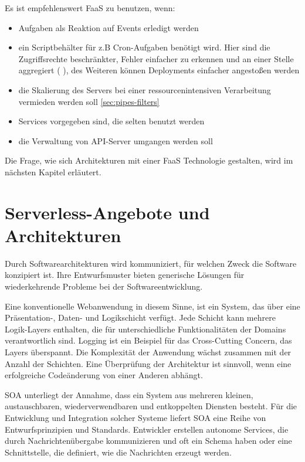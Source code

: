 \documentclass[
12pt,
english,
ngerman,
headsepline,
twoside,
openright,
numbers=noenddot,version=first
]{scrreprt}
\begin{document}
Es ist empfehlenswert \acrshort{FaaS} zu benutzen, wenn:
\begin{itemize}
	\item Aufgaben als Reaktion auf Events erledigt werden
	\item ein Scriptbehälter für z.B Cron-Aufgaben benötigt wird. Hier sind die Zugriffsrechte beschränkter, Fehler einfacher zu erkennen und an einer Stelle aggregiert ( \cite{awsCloudWatch} ), des Weiteren können Deployments einfacher angestoßen werden
	\item die Skalierung des Servers bei einer ressourcenintensiven Verarbeitung vermieden werden soll \autoref{sec:pipes-filters}
	\item Services vorgegeben sind, die selten benutzt werden
	\item die Verwaltung von \acrshort{API}-Server umgangen werden soll
\end{itemize}


Die Frage, wie sich Architekturen mit einer \acrshort{FaaS} Technologie gestalten, wird im nächsten Kapitel erläutert.

\chapter{Serverless-Angebote und Architekturen}

Durch Softwarearchitekturen wird kommuniziert, für welchen Zweck die Software konzipiert ist. Ihre Entwurfsmuster bieten generische Lösungen für wiederkehrende Probleme bei der Softwareentwicklung.


Eine konventionelle Webanwendung in diesem Sinne, ist ein System, das über eine Präsentation-, Daten- und Logikschicht verfügt. Jede Schicht kann mehrere Logik-Layers enthalten, die für unterschiedliche Funktionalitäten der Domains verantwortlich sind. Logging ist ein Beispiel für das Cross-Cutting Concern, das Layers überspannt. Die Komplexität der Anwendung wächst zusammen mit der Anzahl der Schichten.
Eine Überprüfung der Architektur ist sinnvoll, wenn eine erfolgreiche Codeänderung von einer Anderen abhängt.

\acrfull{SOA}
\label{sec:soa} unterliegt der Annahme, dass ein System aus mehreren kleinen, austauschbaren, wiederverwendbaren und entkoppelten Diensten besteht. Für die Entwicklung und Integration solcher Systeme liefert \acrshort{SOA} eine Reihe von Entwurfsprinzipien und Standards. Entwickler erstellen autonome Services, die durch Nachrichtenübergabe kommunizieren und oft ein Schema haben oder eine Schnittstelle, die definiert, wie die Nachrichten erzeugt werden.\cite{cloudEssentials}
\end{document}
